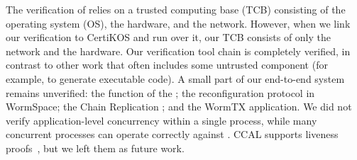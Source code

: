 The verification of \sysname{} relies on a trusted computing base (TCB) consisting of the operating system (OS), the hardware, and the network.
However, when we link our verification to CertiKOS and run over it, our TCB consists of only the network and the hardware.
Our verification tool chain is completely verified, in contrast to other work that often includes some untrusted component (for example, to generate executable code). %
A small part of our end-to-end system remains unverified: the  function of the \WOS{}; the reconfiguration protocol in WormSpace; the Chain Replication \WOR{}; and the WormTX application.
We did not verify application-level concurrency within a single process, while many concurrent processes can operate correctly against \sysname{}. CCAL supports liveness proofs~\cite{mcslock}, but we left them as future work.





